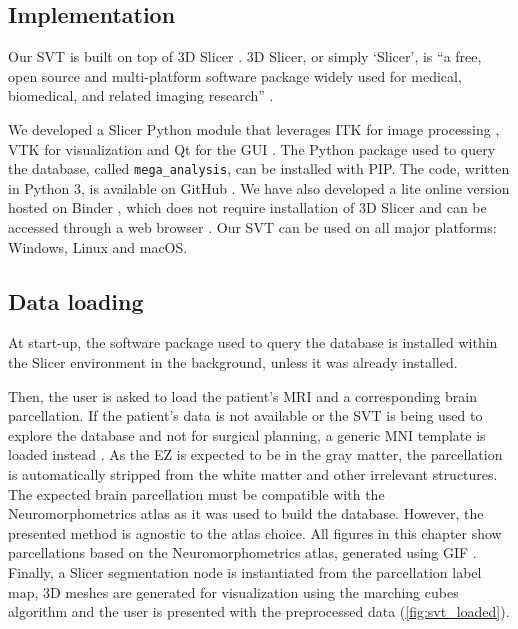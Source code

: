 \subsection{Implementation}
\label{sec:svt_implementation}

Our \ac{SVT} is built on top of 3D Slicer \cite{fedorov_3d_2012}.
3D Slicer, or simply `Slicer', is ``a free, open source and multi-platform software package widely used for medical, biomedical, and related imaging research''%
.

We developed a Slicer Python module that leverages \ac{ITK} for image processing \cite{mccormick_itk_2014}, \ac{VTK} for visualization \cite{schroeder_visualization_2006} and Qt for the \ac{GUI}%
.
The Python package used to query the \svtdatabase database, called \texttt{mega\_analysis}, can be installed with \ac{PIP}.
The code, written in Python 3, is available on GitHub%
\fnurl{\svtgithub}.
We have also developed a lite online version hosted on Binder \cite{bussonnier_binder_2018}, which does not require installation of 3D Slicer and can be accessed through a web browser%
\fnurl{\svtweb}.
Our \ac{SVT} can be used on all major platforms: Windows, Linux and macOS.


\subsection{Data loading}
\label{sec:svt_loading}

At start-up, the software package used to query the database is installed within the Slicer environment in the background, unless it was already installed.

Then, the user is asked to load the patient's \ac{MRI} and a corresponding brain parcellation.
If the patient's data is not available or the \ac{SVT} is being used to explore the database and not for surgical planning, a generic \ac{MNI} template is loaded instead \cite{fonov_unbiased_2009}.
As the \ac{EZ} is expected to be in the gray matter, the parcellation is automatically stripped from the white matter and other irrelevant structures.
The expected brain parcellation must be compatible with the Neuromorphometrics atlas as it was used to build the \svtdatabase database.
However, the presented method is agnostic to the atlas choice.
All figures in this chapter show parcellations based on the Neuromorphometrics atlas, generated using \ac{GIF} \cite{cardoso_geodesic_2015}.
Finally, a Slicer segmentation node is instantiated from the parcellation label map, 3D meshes are generated for visualization using the marching cubes algorithm \cite{lorensen_marching_1987,pinter_polymorph_2019} and the user is presented with the preprocessed data (\cref{fig:svt_loaded}).

